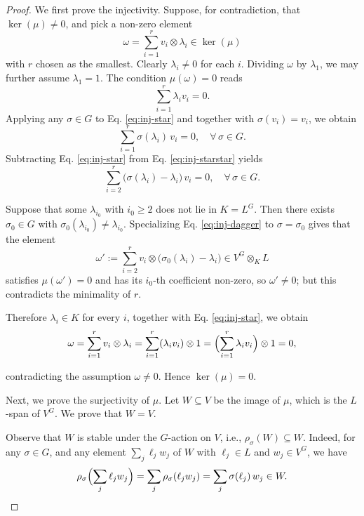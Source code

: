 \documentclass[hidelinks,onefignum,onetabnum]{siamart251216}
\theoremstyle{definition}
\theoremstyle{remark}
\begin{document}
\begin{proof}
We first prove the injectivity. Suppose, for contradiction, that $\ker(\mu)\neq 0$, and pick a non-zero element
	\[
	\omega=\sum_{i=1}^{r}v_{i}\otimes \lambda_{i}\in\ker(\mu)
	\]
	with $r$ chosen as the smallest. Clearly $\lambda_{i}\neq 0$ for each $i$. Dividing $\omega$ by $\lambda_{1}$,
	we may further assume $\lambda_{1}=1$. The condition $\mu(\omega)=0$
	reads
	\begin{equation}\label{eq:inj-star}
		\sum_{i=1}^{r}\lambda_{i}v_{i}=0.
	\end{equation}
	Applying any $\sigma\in G$ to Eq. \eqref{eq:inj-star} and together with $\sigma(v_{i})=v_{i}$, we obtain
	\begin{equation}\label{eq:inj-starstar}
		\sum_{i=1}^{r}\sigma(\lambda_{i})\,v_{i}=0, \quad \forall\,\sigma\in G.
	\end{equation}
	Subtracting Eq. \eqref{eq:inj-star} from Eq. \eqref{eq:inj-starstar} yields
	\begin{equation}\label{eq:inj-dagger}
		\sum_{i=2}^{r}\bigl(\sigma(\lambda_{i})-\lambda_{i}\bigr)\,v_{i}=0,
		\quad \forall\,\sigma\in G.
	\end{equation}
	
	Suppose that some $\lambda_{i_{0}}$ with
	$i_{0}\geq 2$ does not lie in $K=L^{G}$. Then there exists
	$\sigma_{0}\in G$ with
	$\sigma_{0}(\lambda_{i_{0}})\neq \lambda_{i_{0}}$. Specializing Eq.
	\eqref{eq:inj-dagger} to $\sigma=\sigma_{0}$ gives that the element
	\[
	\omega':=\sum_{i=2}^{r}v_{i}\otimes
	\bigl(\sigma_{0}(\lambda_{i})-\lambda_{i}\bigr) \in V^{G}\otimes_{K}L
	\]
	satisfies $\mu(\omega')=0$ and has its $i_{0}$-th coefficient non-zero,
	so $\omega'\neq 0$; but this contradicts the
	minimality of $r$.
	
	Therefore $\lambda_{i}\in K$ for every $i$, together with Eq. \eqref{eq:inj-star}, we obtain
	\[
	\omega=\sum_{i=1}^{r}v_{i}\otimes \lambda_{i}
	=\sum_{i=1}^{r}(\lambda_{i}v_{i})\otimes 1
	=\Bigl(\sum_{i=1}^{r}\lambda_{i}v_{i}\Bigr)\otimes 1=0,
	\]


contradicting the assumption $\omega\neq 0$. Hence $\ker(\mu)=0$.
	
	
Next, we prove the surjectivity of $\mu$. Let $W\subseteq V$ be the image of $\mu$, which is the $L$-span of $V^{G}$. We prove that $W=V$.
	
Observe that $W$ is stable under the $G$-action on $V$, i.e., $\rho_{\sigma}(W)\subseteq W$. Indeed, for any
$\sigma\in G$, and any element $\sum_{j}\ell_{j}w_{j}$ of $W$ with $\ell_{j}\in L$ and $w_{j}\in V^{G}$, we have
\[
\rho_{\sigma}\Bigl(\sum_{j}\ell_{j}w_{j}\Bigr)
=\sum_{j}\rho_{\sigma}(\ell_{j}w_{j})
=\sum_{j}\sigma(\ell_{j})\,w_{j}\in W.
\]



\end{proof}
\end{document}
